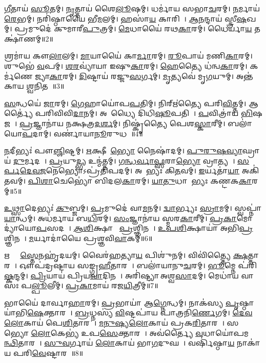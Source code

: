 \ul{𑌗𑍀}𑌤𑌾𑌯॑ \ul{𑌸𑍂}𑌤𑌮𑍍।
\ul{𑌨𑍃}𑌤𑍍𑌤𑌾𑌯॑ 𑌶𑍈\ul{𑌲𑍂}𑌷𑌮𑍍।
𑌧𑌰𑍍𑌮𑌾॑𑌯 𑌸𑌭𑌾\ul{𑌚}𑌰𑌮𑍍।
\ul{𑌨}𑌰𑍍𑌮𑌾𑌯॑ \ul{𑌰𑍇}𑌭𑌮𑍍।
𑌨𑌰𑌿॑𑌷𑍍𑌠𑌾𑌯𑍈 𑌭𑍀\ul{𑌮}𑌲𑌮𑍍।
𑌹𑌸𑌾॑\ul{𑌯} 𑌕𑌾𑌰𑌿𑌮𑍍᳚।
\ul{𑌆}\ul{𑌨}𑌨𑍍𑌦𑌾𑌯॑ 𑌸𑍍𑌤𑍍𑌰𑍀\ul{𑌷}𑌖𑌮𑍍।
𑌪𑍍𑌰𑌮𑍁𑌦𑍇॑ 𑌕𑍁𑌮𑌾𑌰𑍀\ul{𑌪𑍁}𑌤𑍍𑌰𑌮𑍍।
\ul{𑌮𑍇}𑌧𑌾𑌯𑍈॑ 𑌰𑌥\ul{𑌕𑌾}𑌰𑌮𑍍।
𑌧𑍈𑌰𑍍𑌯𑌾॑\ul{𑌯} 𑌤𑌕𑍍𑌷𑌾॑𑌣𑌮𑍍॥2॥

𑌶𑍍𑌰𑌮𑌾॑𑌯 𑌕𑍗\ul{𑌲𑌾}𑌲𑌮𑍍।
\ul{𑌮𑌾}𑌯𑌾𑌯𑍈॑ 𑌕𑌾\ul{𑌰𑍍𑌮𑌾}𑌰𑌮𑍍।
\ul{𑌰𑍂}𑌪𑌾𑌯॑ 𑌮𑌣𑌿\ul{𑌕𑌾}𑌰𑌮𑍍।
𑌶𑍁𑌭𑍇॑ \ul{𑌵}𑌪𑌮𑍍।
\ul{𑌶}\ul{𑌰}𑌵𑍍𑌯𑌾॑𑌯𑌾 𑌇𑌷𑍁\ul{𑌕𑌾}𑌰𑌮𑍍।
\ul{𑌹𑍇}𑌤𑍍𑌯𑍈 𑌧॑𑌨𑍍𑌵\ul{𑌕𑌾}𑌰𑌮𑍍।
𑌕𑌰𑍍𑌮॑𑌣𑍇 𑌜𑍍𑌯𑌾\ul{𑌕𑌾}𑌰𑌮𑍍।
\ul{𑌦𑌿}𑌷𑍍𑌟𑌾𑌯॑ 𑌰𑌜𑍍𑌜𑍁\ul{𑌸}𑌰𑍍𑌗𑌮𑍍।
\ul{𑌮𑍃}𑌤𑍍𑌯𑌵𑍇॑ 𑌮𑍃\ul{𑌗}𑌯𑍁𑌮𑍍।
𑌅𑌨𑍍𑌤॑𑌕𑌾𑌯 \ul{𑌶𑍍𑌵}𑌨𑌿𑌤𑌮𑍍᳚॥3॥

\ul{𑌸}𑌨𑍍𑌧𑌯𑍇॑ \ul{𑌜𑌾}𑌰𑌮𑍍।
\ul{𑌗𑍇}𑌹𑌾𑌯𑍋॑𑌪\ul{𑌪}𑌤𑌿𑌮𑍍।
𑌨𑌿𑌰𑍍\mbox{}𑌋॑𑌤𑍍𑌯𑍈 𑌪𑌰𑌿\ul{𑌵𑌿}𑌤𑍍𑌤𑌮𑍍।
𑌆𑌰𑍍𑌤𑍍𑌯𑍈॑ 𑌪𑌰𑌿𑌵𑌿𑌵𑌿\ul{𑌦𑌾}𑌨𑌮𑍍।
𑌅𑌰𑌾᳚𑌧𑍍𑌯𑍈 𑌦𑌿𑌧𑌿\ul{𑌷𑍂}𑌪𑌤𑌿𑌮𑍍᳚।
\ul{𑌪}𑌵𑌿𑌤𑍍𑌰𑌾॑𑌯 \ul{𑌭𑌿}𑌷𑌜𑌮𑍍᳚।
\ul{𑌪𑍍𑌰}𑌜𑍍𑌞𑌾𑌨𑌾॑𑌯 𑌨𑌕𑍍𑌷𑌤𑍍𑌰\ul{𑌦}\ul{𑌰𑍍}𑌶𑌮𑍍।
𑌨𑌿𑌷𑍍𑌕𑍃॑𑌤𑍍𑌯𑍈 𑌪𑍇𑌶\ul{𑌸𑍍𑌕𑌾}𑌰𑍀𑌮𑍍।
𑌬𑌲𑌾॑𑌯𑍋\ul{𑌪}𑌦𑌾𑌮𑍍।
𑌵𑌰𑍍𑌣𑌾॑𑌯𑌾\ul{𑌨𑍂}𑌰𑍁𑌧𑌮𑍍᳚॥4॥

\ul{𑌨}𑌦𑍀𑌭𑍍𑌯𑌃॑ 𑌪𑍗\ul{𑌞𑍍𑌜𑌿}𑌷𑍍𑌟𑌮𑍍।
\ul{𑌋}𑌕𑍍𑌷𑍀𑌕𑌾᳚\ul{𑌭𑍍𑌯𑍋} 𑌨𑍈𑌷𑌾॑𑌦𑌮𑍍।
\ul{𑌪𑍁}\ul{𑌰𑍁}\ul{𑌷}\ul{𑌵𑍍𑌯𑌾}𑌘𑍍𑌰𑌾𑌯॑ \ul{𑌦𑍁}𑌰𑍍𑌮𑌦𑌮𑍍᳚।
\ul{𑌪𑍍𑌰}𑌯𑍁\ul{𑌦𑍍𑌭𑍍𑌯} 𑌉𑌨𑍍𑌮॑𑌤𑍍𑌤𑌮𑍍।
\ul{𑌗}\ul{𑌨𑍍𑌧}\ul{𑌰𑍍𑌵𑌾}\ul{𑌫𑍍𑌸}𑌰𑌾\ul{𑌭𑍍𑌯𑍋} 𑌵𑍍𑌰𑌾𑌤𑍍𑌯𑌮𑍍᳚।
\ul{𑌸}\ul{𑌰𑍍𑌪}\ul{𑌦𑍇}\ul{𑌵}\ul{𑌜}𑌨𑍇𑌭𑍍𑌯𑍋\-𑌽𑌪𑍍𑌰॑𑌤𑌿𑌪𑌦𑌮𑍍।
𑌅𑌵𑍇᳚𑌭𑍍𑌯𑌃 𑌕𑌿\ul{𑌤}𑌵𑌮𑍍।
\ul{𑌇}𑌰𑍍𑌯𑌤𑌾॑\ul{𑌯𑌾} 𑌅𑌕𑌿॑𑌤𑌵𑌮𑍍।
\ul{𑌪𑌿}\ul{𑌶𑌾}𑌚𑍇𑌭𑍍𑌯𑍋॑ 𑌬𑌿𑌦𑌲\ul{𑌕𑌾}𑌰𑌮𑍍।
\ul{𑌯𑌾}\ul{𑌤𑍁}𑌧𑌾𑌨𑍇᳚𑌭𑍍𑌯𑌃 𑌕𑌣𑍍𑌟𑌕\ul{𑌕𑌾}𑌰𑌮𑍍॥5॥

\ul{𑌉}\ul{𑌥𑍍𑌸𑌾}𑌦𑍇𑌭𑍍𑌯𑌃॑ \ul{𑌕𑍁}𑌬𑍍𑌜𑌮𑍍।
\ul{𑌪𑍍𑌰}𑌮𑍁𑌦𑍇॑ 𑌵𑌾\ul{𑌮}𑌨𑌮𑍍।
\ul{𑌦𑍍𑌵𑌾}𑌰𑍍𑌭𑍍𑌯𑌃 \ul{𑌸𑍍𑌰𑌾}𑌮𑌮𑍍।
𑌸𑍍𑌵𑌪𑍍𑌨𑌾॑\ul{𑌯𑌾}𑌨𑍍𑌧𑌮𑍍।
𑌅𑌧॑𑌰𑍍𑌮𑌾𑌯 𑌬\ul{𑌧𑌿}𑌰𑌮𑍍।
\ul{𑌸𑌂}𑌜𑍍𑌞𑌾𑌨𑌾॑𑌯 𑌸𑍍𑌮𑌰\ul{𑌕𑌾}𑌰𑍀𑌮𑍍।
\ul{𑌪𑍍𑌰}\ul{𑌕𑌾}𑌮𑍋𑌦𑍍𑌯𑌾॑𑌯𑍋\ul{𑌪}𑌸𑌦𑌮𑍍᳚।
\ul{𑌆}\ul{𑌶𑌿}𑌕𑍍𑌷𑌾𑌯𑍈᳚ \ul{𑌪𑍍𑌰}𑌶𑍍𑌞𑌿𑌨𑌮𑍍᳚।
\ul{𑌉}\ul{𑌪}\ul{𑌶𑌿}𑌕𑍍𑌷𑌾𑌯𑌾॑ 𑌅𑌭𑌿\ul{𑌪𑍍𑌰}𑌶𑍍𑌞𑌿𑌨𑌮𑍍᳚।
\ul{𑌮}𑌰𑍍𑌯𑌾𑌦𑌾॑𑌯𑍈 𑌪𑍍𑌰𑌶𑍍𑌞𑌵𑌿\ul{𑌵𑌾}𑌕𑌮𑍍॥6॥

𑌋𑌤𑍍𑌯𑍈᳚ \ul{𑌸𑍍𑌤𑍇}𑌨𑌹𑍃॑𑌦𑌯𑌮𑍍।
𑌵𑍈𑌰॑𑌹𑌤𑍍𑌯𑌾\ul{𑌯} 𑌪𑌿𑌶𑍁॑𑌨𑌮𑍍।
𑌵𑌿𑌵𑌿॑𑌤𑍍𑌤𑍍𑌯𑍈 \ul{𑌕𑍍𑌷}𑌤𑍍𑌤𑌾𑌰𑌮𑍍᳚।
𑌔𑌪॑𑌦𑍍𑌰𑌷𑍍𑌟𑌾𑌯 𑌸𑌙𑍍𑌗𑍍𑌰\ul{𑌹𑍀}𑌤𑌾𑌰𑌮𑍍᳚।
𑌬𑌲𑌾॑𑌯𑌾𑌨𑍁\ul{𑌚}𑌰𑌮𑍍।
\ul{𑌭𑍂}𑌮𑍍𑌨𑍇 𑌪॑𑌰𑌿\ul{𑌷𑍍𑌕}𑌨𑍍𑌦𑌮𑍍।
\ul{𑌪𑍍𑌰𑌿}𑌯𑌾𑌯॑ 𑌪𑍍𑌰𑌿𑌯\ul{𑌵𑌾}𑌦𑌿𑌨𑌮𑍍᳚।
𑌅𑌰𑌿॑𑌷𑍍𑌟𑍍𑌯𑌾 𑌅𑌶𑍍𑌵\ul{𑌸𑌾}𑌦𑌮𑍍।
𑌮𑍇𑌧𑌾॑𑌯 𑌵𑌾𑌸𑌃 𑌪\ul{𑌲𑍍𑌪𑍂}𑌲𑍀𑌮𑍍।
\ul{𑌪𑍍𑌰}\ul{𑌕𑌾}𑌮𑌾𑌯॑ 𑌰𑌜\ul{𑌯𑌿}𑌤𑍍𑌰𑍀𑌮𑍍॥7॥

𑌭𑌾𑌯𑍈॑ 𑌦𑌾𑌰𑍍𑌵𑌾\ul{𑌹𑌾}𑌰𑌮𑍍।
\ul{𑌪𑍍𑌰}𑌭𑌾𑌯𑌾॑ 𑌆\ul{𑌗𑍍𑌨𑍇}𑌨𑍍𑌧𑌮𑍍।
𑌨𑌾𑌕॑𑌸𑍍𑌯 \ul{𑌪𑍃}𑌷𑍍𑌠𑌾𑌯𑌾॑𑌭𑌿\ul{𑌷𑍇}𑌕𑍍𑌤𑌾𑌰𑌮𑍍᳚।
\ul{𑌬𑍍𑌰}𑌧𑍍𑌨𑌸𑍍𑌯॑ \ul{𑌵𑌿}𑌷𑍍𑌟𑌪𑌾॑𑌯 𑌪𑌾𑌤𑍍𑌰𑌨𑌿\ul{𑌰𑍍𑌣𑍇}𑌗𑌮𑍍।
\ul{𑌦𑍇}\ul{𑌵}\ul{𑌲𑍋}𑌕𑌾𑌯॑ 𑌪𑍇\ul{𑌶𑌿}𑌤𑌾𑌰𑌮𑍍᳚।
\ul{𑌮}\ul{𑌨𑍁}\ul{𑌷𑍍𑌯}\ul{𑌲𑍋}𑌕𑌾𑌯॑ 𑌪𑍍𑌰𑌕\ul{𑌰𑌿}𑌤𑌾𑌰𑌮𑍍᳚।
𑌸𑌰𑍍𑌵𑍇᳚𑌭𑍍𑌯𑍋 \ul{𑌲𑍋}𑌕𑍇𑌭𑍍𑌯॑ 𑌉𑌪\ul{𑌸𑍇}𑌕𑍍𑌤𑌾𑌰𑌮𑍍᳚।
𑌅𑌵॑𑌰𑍍𑌤𑍍𑌯𑍈 \ul{𑌵}𑌧𑌾𑌯𑍋॑𑌪𑌮\ul{𑌨𑍍𑌥𑌿}𑌤𑌾𑌰𑌮𑍍᳚।
\ul{𑌸𑍁}\ul{𑌵}𑌰𑍍𑌗𑌾𑌯॑ \ul{𑌲𑍋}𑌕𑌾𑌯॑ 𑌭𑌾\ul{𑌗}𑌦𑍁𑌘𑌮𑍍᳚।
𑌵𑌰𑍍\mbox{}𑌷𑌿॑𑌷𑍍𑌠𑌾\ul{𑌯} 𑌨𑌾𑌕𑌾॑𑌯 𑌪𑌰𑌿\ul{𑌵𑍇}𑌷𑍍𑌟𑌾𑌰𑌮𑍍᳚॥8॥

